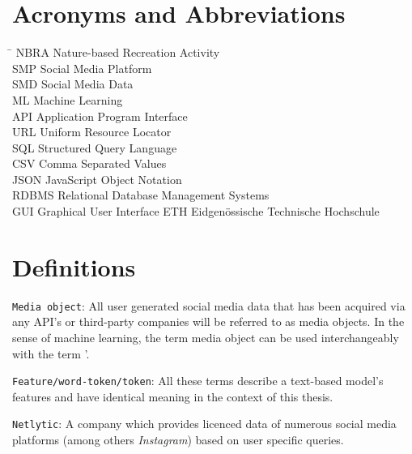 
\section*{Acronyms and Abbreviations}
\begin{tabbing}
 \hspace*{1.6cm}  \= \kill
 NBRA \> Nature-based Recreation Activity \\[0.5ex]
 SMP \> Social Media Platform \\
 SMD \> Social Media Data \\
 ML \> Machine Learning \\
 API \> Application Program Interface \\
 URL \> Uniform Resource Locator \\
 SQL \> Structured Query Language \\
 CSV \> Comma Separated Values \\
 JSON \> JavaScript Object Notation \\
 RDBMS \> Relational Database Management Systems \\
 GUI \> Graphical User Interface
 ETH \> Eidgen\"{o}ssische Technische Hochschule
\end{tabbing}

\section*{Definitions}
\texttt{Media object}: All user generated social media data that has been acquired via any API\rq s or third-party companies will be referred to as media objects. In the sense of machine learning, the term media object can be used interchangeably with the term \lqdocument\rq.\newline

\texttt{Feature/word-token/token}: All these terms describe a text-based model\rq s features and have identical meaning in the context of this thesis.\newline

\texttt{Netlytic}: A company which provides licenced data of numerous social media platforms (among others \textit{Instagram}) based on user specific queries.\newline

